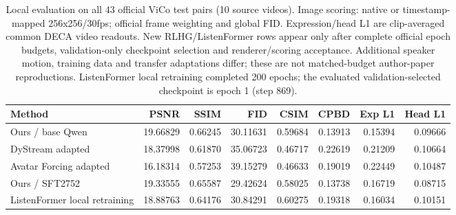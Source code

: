 \begin{table}[t]
\centering\small
\caption{Local evaluation on all 43 official ViCo test pairs (10 source videos). Image scoring: native or timestamp-mapped 256x256/30fps; official frame weighting and global FID. Expression/head L1 are clip-averaged common DECA video readouts. New RLHG/ListenFormer rows appear only after complete official epoch budgets, validation-only checkpoint selection and renderer/scoring acceptance. Additional speaker motion, training data and transfer adaptations differ; these are not matched-budget author-paper reproductions. ListenFormer local retraining completed 200 epochs; the evaluated validation-selected checkpoint is epoch 1 (step 869).}
\label{tab:vico-more-rgb}
\setlength{\tabcolsep}{4pt}
\begin{tabular}{lrrrrrrr}
\toprule
Method & PSNR & SSIM & FID & CSIM & CPBD & Exp L1 & Head L1 \\
\midrule
Ours / base Qwen & 19.66829 & 0.66245 & 30.11631 & 0.59684 & 0.13913 & 0.15394 & 0.09666 \\
DyStream adapted & 18.37998 & 0.61870 & 35.06723 & 0.46717 & 0.22619 & 0.21209 & 0.10664 \\
Avatar Forcing adapted & 16.18314 & 0.57253 & 39.15279 & 0.46633 & 0.19019 & 0.22449 & 0.10487 \\
Ours / SFT2752 & 19.33555 & 0.65587 & 29.42624 & 0.58025 & 0.13738 & 0.16719 & 0.08715 \\
ListenFormer local retraining & 18.88763 & 0.64176 & 30.84291 & 0.60275 & 0.19318 & 0.16034 & 0.10151 \\
\bottomrule
\end{tabular}
\end{table}

